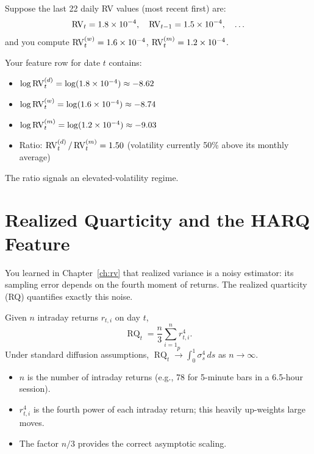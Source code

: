 \begin{workedexample}
Suppose the last 22 daily RV values (most recent first) are:
\[
\operatorname{RV}_t = 1.8 \times 10^{-4}, \quad \operatorname{RV}_{t-1} = 1.5 \times 10^{-4}, \quad \ldots
\]
and you compute $\operatorname{RV}_t^{(w)} = 1.6 \times 10^{-4}$, $\operatorname{RV}_t^{(m)} = 1.2 \times 10^{-4}$.

Your feature row for date $t$ contains:
\begin{itemize}[nosep]
  \item $\log \operatorname{RV}_t^{(d)} = \log(1.8 \times 10^{-4}) \approx -8.62$
  \item $\log \operatorname{RV}_t^{(w)} = \log(1.6 \times 10^{-4}) \approx -8.74$
  \item $\log \operatorname{RV}_t^{(m)} = \log(1.2 \times 10^{-4}) \approx -9.03$
  \item Ratio: $\operatorname{RV}_t^{(d)} / \operatorname{RV}_t^{(m)} = 1.50$ (volatility currently 50\% above its monthly average)
\end{itemize}
The ratio signals an elevated-volatility regime.
\end{workedexample}

\section{Realized Quarticity and the HARQ Feature}\label{sec:feat-rq}

You learned in Chapter~\ref{ch:rv} that realized variance is a noisy estimator: its sampling error depends on the fourth moment of returns.
The realized quarticity (RQ) quantifies exactly this noise.

\begin{definition}
Given $n$ intraday returns $r_{t,i}$ on day $t$,
\begin{equation}\label{eq:rq-feat}
\operatorname{RQ}_t = \frac{n}{3} \sum_{i=1}^{n} r_{t,i}^4.
\end{equation}
Under standard diffusion assumptions, $\operatorname{RQ}_t \xrightarrow{p} \int_0^1 \sigma_s^4 \, ds$ as $n \to \infty$.
\end{definition}

\begin{itemize}[nosep]
  \item $n$ is the number of intraday returns (e.g., 78 for 5-minute bars in a 6.5-hour session).
  \item $r_{t,i}^4$ is the fourth power of each intraday return; this heavily up-weights large moves.
  \item The factor $n/3$ provides the correct asymptotic scaling.
\end{itemize}


